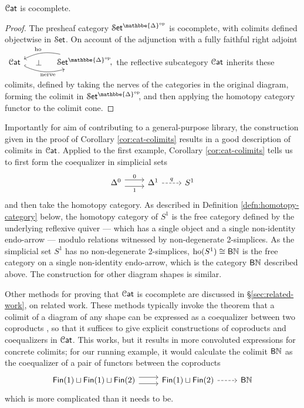 \documentclass[a4paper,UKenglish,cleveref, autoref, thm-restate]{lipics-v2021}
\newcommand{\op}{\textup{op}}
\newcommand{\ho}{\textup{ho}}
\newcommand{\nerve}{\textup{nerve}}
\newcommand{\cat}[1]{\textup{\textsf{#1}}}%
\newcommand{\NN}{\mathbb{N}}
\newcommand{\1}{\mathbbe{1}}
\newcommand{\2}{\mathbbe{2}}
\newcommand{\3}{\mathbbe{3}}
\newcommand{\DDelta}{\mathbbe{\Delta}}
\newcommand{\Fin}{\cat{Fin}}
\newcommand{\Cat}{\mathcal{C}\cat{at}}
\newcommand{\Set}{\mathcal{S}\cat{et}}
\newcommand{\cdoc}[2][]{\href{https://leanprover-community.github.io/mathlib4_docs/find/?pattern=CategoryTheory.#1#2\#doc}{\texttt{#2}}}
\begin{document}
\begin{corollary}[\cdoc{Cat.instHasColimits}]\label{cor:cat-colimits} $\Cat$ is cocomplete.
\end{corollary}
\begin{proof}
The presheaf category $\Set^{\DDelta^\op}$ is cocomplete, with colimits defined objectwise in $\Set$. On account of the adjunction with a fully faithful right adjoint
$ \begin{tikzcd}[column sep=large] \Cat \arrow[r, bend right=20, hook, "{\nerve}"' pos=.6] \arrow[r, phantom, "\bot"] & \Set^{\DDelta^\op}\! ,\!\! \arrow[l, bend right=20, "{\ho}"' pos=.45]
\end{tikzcd}$  the reflective subcategory $\Cat$ inherits these colimits, defined by taking the nerves of the categories in the original diagram, forming the colimit in $\Set^{\DDelta^\op}\!\!$, and then applying the homotopy category functor to the colimit cone.
\end{proof}

Importantly for aim of contributing to a general-purpose library, the construction given in the proof of Corollary \ref{cor:cat-colimits} results in a good description of colimits in $\Cat$. Applied to the first example, Corollary \ref{cor:cat-colimits} tells us to first form the coequalizer in simplicial sets
\[ \begin{tikzcd} \Delta^0 \arrow[r, shift left=.4em, "0"] \arrow[r, shift right=.4em, "1"'] & \Delta^1 \arrow[r, dashed, "q"] & S^1 \end{tikzcd}\] and then take the homotopy category. As described in Definition \ref{defn:homotopy-category} below, the homotopy category of $S^1$ is the free category defined by the underlying reflexive quiver --- which has a single object and a single non-identity endo-arrow --- modulo relations witnessed by non-degenerate 2-simplices. As the simplicial set $S^1$ has no non-degenerate 2-simplices, $\ho(S^1) \cong \cat{B}\NN$ is the free category on a single non-identity endo-arrow, which is the category $\cat{B}\NN$ described above. The construction for other diagram shapes is similar.

Other methods for proving that $\Cat$ is cocomplete are discussed in \S\ref{sec:related-work}, on related work. These methods typically invoke the theorem that a colimit of a diagram of any shape can be expressed as a coequalizer between two coproducts \cite[V.2.2]{MacLane:1998cw}, so that it suffices to give explicit constructions of coproducts and coequalizers in $\Cat$. This works, but it results in more convoluted expressions for concrete colimits; for our running example, it would calculate the colimit $\cat{B}\NN$ as the coequalizer of a pair of functors between the coproducts
\[ \begin{tikzcd} \Fin(1) \sqcup \Fin(1) \sqcup \Fin(2) \arrow[r, shift left=.4em] \arrow[r, shift right=.4em] & \Fin(1) \sqcup \Fin(2) \arrow[r, dashed] & \cat{B}\NN \end{tikzcd}\]
which is more complicated than it needs to be.
\end{document}
